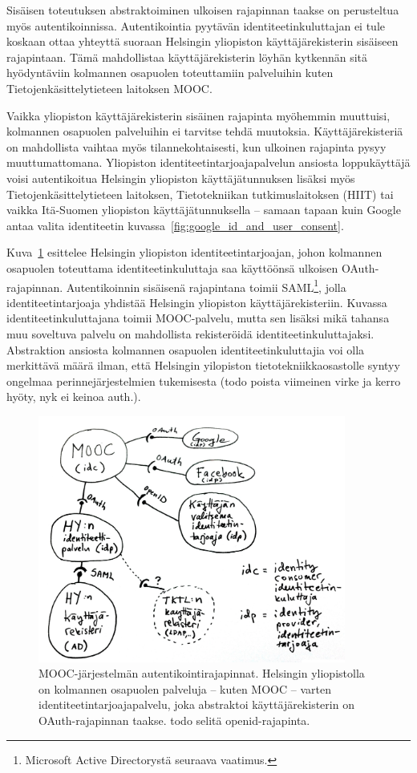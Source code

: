 \documentclass[finnish,gradu]{tktltiki}
\begin{document}
  Sisäisen toteutuksen abstraktoiminen ulkoisen rajapinnan taakse on perusteltua myös autentikoinnissa. Autentikointia pyytävän identiteetinkuluttajan ei tule koskaan ottaa yhteyttä suoraan Helsingin yliopiston käyttäjärekisterin sisäiseen rajapintaan. Tämä mahdollistaa käyttäjärekisterin löyhän kytkennän sitä hyödyntäviin kolmannen osapuolen toteuttamiin palveluihin kuten Tietojenkäsittelytieteen laitoksen MOOC.

  Vaikka yliopiston käyttäjärekisterin sisäinen rajapinta myöhemmin muuttuisi, kolmannen osapuolen palveluihin ei tarvitse tehdä muutoksia. Käyttäjärekisteriä on mahdollista vaihtaa myös tilannekohtaisesti, kun ulkoinen rajapinta pysyy muuttumattomana. Yliopiston identiteetintarjoajapalvelun ansiosta loppukäyttäjä voisi autentikoitua Helsingin yliopiston käyttäjätunnuksen lisäksi myös Tietojenkäsittelytieteen laitoksen, Tietotekniikan tutkimuslaitoksen (HIIT) tai vaikka Itä-Suomen yliopiston käyttäjätunnuksella -- samaan tapaan kuin Google antaa valita identiteetin kuvassa~\ref{fig:google_id_and_user_consent}.

  Kuva~\ref{fig:mooc_hy_idp} esittelee Helsingin yliopiston identiteetintarjoajan, johon kolmannen osapuolen toteuttama identiteetinkuluttaja saa käyttöönsä ulkoisen OAuth-rajapinnan. Autentikoinnin sisäisenä rajapintana toimii SAML\footnote{Microsoft Active Directorystä seuraava vaatimus.}, jolla identiteetintarjoaja yhdistää Helsingin yliopiston käyttäjärekisteriin. Kuvassa identiteetinkuluttajana toimii MOOC-palvelu, mutta sen lisäksi mikä tahansa muu soveltuva palvelu on mahdollista rekisteröidä identiteetinkuluttajaksi.
  Abstraktion ansiosta kolmannen osapuolen identiteetinkuluttajia voi olla merkittävä määrä ilman, että Helsingin yilopiston tietotekniikkaosastolle syntyy ongelmaa perinnejärjestelmien tukemisesta (todo poista viimeinen virke ja kerro hyöty, nyk ei keinoa auth.).

  \begin{figure}[h!]
    \centering
    \includegraphics[width=0.9\textwidth]{images/mooc_hy_idp.jpg}
    \caption{MOOC-järjestelmän autentikointirajapinnat. Helsingin yliopistolla on kolmannen osapuolen palveluja -- kuten MOOC -- varten identiteetintarjoajapalvelu, joka abstraktoi käyttäjärekisterin on OAuth-rajapinnan taakse. todo selitä openid-rajapinta.}
    \label{fig:mooc_hy_idp}
  \end{figure}
\end{document}
